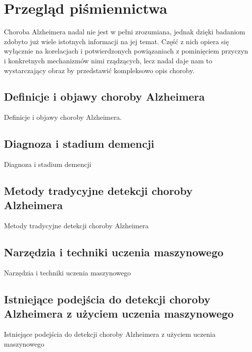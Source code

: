 \chapter{Przegląd piśmiennictwa}

Choroba Alzheimera nadal nie jest w pełni zrozumiana, jednak dzięki badaniom zdobyto już wiele istotnych informacji na jej temat.
Część z nich opiera się wyłącznie na korelacjach i potwierdzonych powiązaniach z pominięciem przyczyn i konkretnych mechanizmów nimi rządzących, lecz nadal daje nam to wystarczający obraz by przedstawić kompleksowo opis choroby.

\section{Definicje i objawy choroby Alzheimera}

Definicje i objawy choroby Alzheimera.

\section{Diagnoza i stadium demencji}

Diagnoza i stadium demencji

\section{Metody tradycyjne detekcji choroby Alzheimera}

Metody tradycyjne detekcji choroby Alzheimera

\section{Narzędzia i techniki uczenia maszynowego}

Narzędzia i techniki uczenia maszynowego

\section{Istniejące podejścia do detekcji choroby Alzheimera z użyciem uczenia maszynowego}

Istniejące podejścia do detekcji choroby Alzheimera z użyciem uczenia maszynowego
